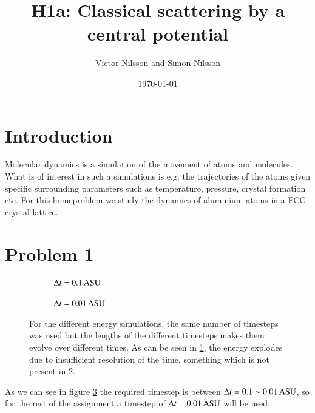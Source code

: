 



\title{H1a: Classical scattering by a central potential}
\author{Victor Nilsson and Simon Nilsson}
\date{\today}





\section*{Introduction}

Molecular dynamics is a simulation of the movement of atoms and molecules. What is of interest in such a simulations is e.g. the trajectories of the atoms given specific surrounding parameters such as temperature, pressure, crystal formation etc. For this homeproblem we study the dynamics of aluminium atoms in a FCC crystal lattice.

\section*{Problem 1}

\begin{figure}[H]
    \centering
    \captionsetup[subfigure]{justification=centering}
    \begin{subfigure}[b]{0.40\textwidth}
        \centering
        \resizebox{\columnwidth}{!}{}
        \caption{$\Delta t =\unit[0.1]{ASU}$}
        \label{fig:timestep_a}
    \end{subfigure}
    \begin{subfigure}[b]{0.40\textwidth}
        \centering
        \resizebox{\columnwidth}{!}{}
        \caption{$\Delta t =\unit[0.01]{ASU}$}
        \label{fig:timestep_b}
    \end{subfigure}
    \caption{For the different energy simulations, the same number of timesteps was used but the lengths of the different timesteps makes them evolve over different times. As can be seen in \ref{fig:timestep_a}, the energy explodes due to insufficient resolution of the time, something which is not present in \ref{fig:timestep_b}.}
    \label{fig:timestep}
\end{figure}

As we can see in figure \ref{fig:timestep} the required timestep is between $\Delta t = 0.1 \sim \unit[0.01]{ASU}$, so for the rest of the assignment a timestep of $\Delta t = \unit[0.01]{ASU}$ will be used.



